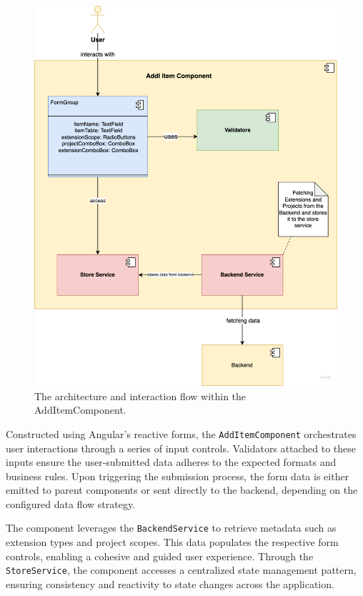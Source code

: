\begin{figure}[H]
    \centering
    \includegraphics[width=\textwidth]{./images/frontend/add-item-component}
    \caption{The architecture and interaction flow within the AddItemComponent.}
    \label{fig:additem_component}
\end{figure}

Constructed using Angular's reactive forms, the \texttt{AddItemComponent} orchestrates user interactions through a series of input controls.
Validators attached to these inputs ensure the user-submitted data adheres to the expected formats and business rules.
Upon triggering the submission process, the form data is either emitted to parent components or sent directly to the backend, depending on the configured data flow strategy.

The component leverages the \texttt{BackendService} to retrieve metadata such as extension types and project scopes.
This data populates the respective form controls, enabling a cohesive and guided user experience.
Through the \texttt{StoreService}, the component accesses a centralized state management pattern, ensuring consistency and reactivity to state changes across the application.

